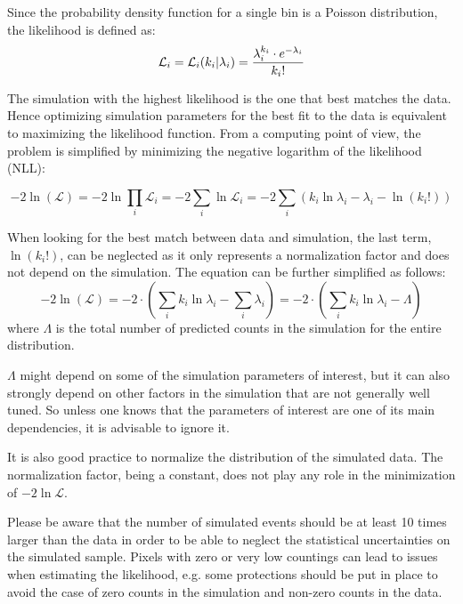 \documentclass{article}
\newcommand{\Ell}{\ensuremath{\mathcal{L}}\xspace}
\begin{document}
Since the probability density function for a single bin is a Poisson distribution, the likelihood is defined as:
\begin{equation}
\Ell_i =    \likelihood = \frac{\lambda_i^{k_i} \cdot e^{-\lambda_i}}{k_i!}
\end{equation}

The simulation with the highest likelihood is the one that best matches the data. Hence optimizing simulation parameters for the best fit to the data is equivalent to maximizing the likelihood function. From a computing point of view, the problem is simplified by minimizing the negative logarithm of the likelihood (NLL):

\begin{equation}
 - 2\ln(\Ell) = -2\ln{\prod_i{\Ell_i}} = -2 \sum_i{\ln{\Ell_i}}
    = -2\sum_i{(k_i \ln{\lambda_i} - \lambda_i - \ln{(k_i!)}) }
    \end{equation}
    
When looking for the best match between data and simulation, the last term, $\ln{(k_i!)}$, can be neglected as it only represents a normalization factor and does not depend on the simulation.
The equation can be further simplified as follows:
\begin{equation}
 - 2\ln(\Ell) =   -2\cdot \left( \sum_i{k_i \ln{\lambda_i}} - \sum_i{\lambda_i}   \right) =  -2\cdot \left( \sum_i{k_i \ln{\lambda_i}} - \Lambda \right)
\end{equation}
where $\Lambda$ is the total number of predicted counts in the simulation for the entire distribution. 

$\Lambda$ might depend on some of the simulation parameters of interest, but it can also strongly depend on other factors in the simulation that are not generally well tuned. So unless one knows that the parameters of interest are one of its main dependencies, it is advisable to ignore it. 

It is also good practice to normalize the distribution of the simulated data. The normalization factor, being a constant, does not play any role in the minimization of $-2\ln{\Ell}$.


Please be aware that the number of simulated
events should be at least 10 times larger than the data in order to be
able to neglect the statistical uncertainties on the simulated sample.
Pixels with zero or very low countings can lead to issues when
estimating the likelihood, e.g. some protections should be put in place
to avoid the case of zero counts in the simulation and non-zero counts
in the data.
\end{document}
